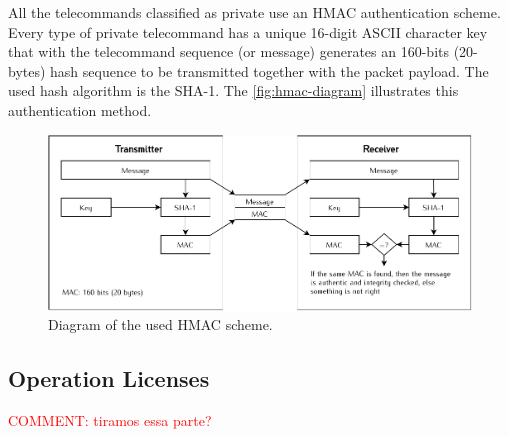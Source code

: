 All the telecommands classified as private use an HMAC authentication scheme. Every type of private telecommand has a unique 16-digit ASCII character key that with the telecommand sequence (or message) generates an 160-bits (20-bytes) hash sequence to be transmitted together with the packet payload. The used hash algorithm is the SHA-1. The \autoref{fig:hmac-diagram} illustrates this authentication method.

\begin{figure}[!htb]
    \begin{center}
        \includegraphics[width=\textwidth]{figures/hmac-diagram.pdf}
        \caption{Diagram of the used HMAC scheme.}
        \label{fig:hmac-diagram}
    \end{center}
\end{figure}

\subsection{Operation Licenses}

\textcolor{red}{COMMENT: tiramos essa parte?}
